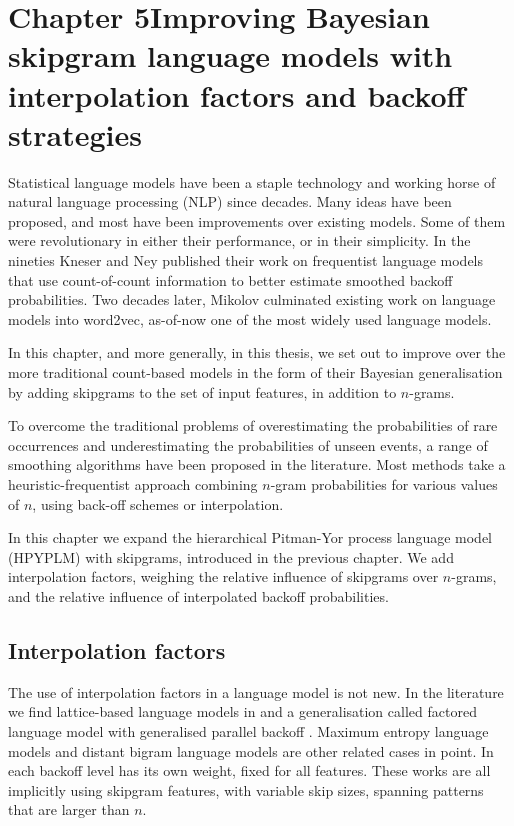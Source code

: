 \chapter{Chapter 5\newline Improving Bayesian skipgram language models \newline  with interpolation factors and backoff strategies}\label{chap:interpol}

Statistical language models have been a staple technology and working horse of natural language processing (NLP) since decades. Many ideas have been proposed, and most have been improvements over existing models. Some of them were revolutionary in either their performance, or in their simplicity. In the nineties Kneser and Ney\autocite{kneser1995improved} published their work on frequentist language models that use count-of-count information to better estimate smoothed backoff probabilities. Two decades later, Mikolov culminated existing work on language models into word2vec,\autocite{mikolov2013distributed} as-of-now one of the most widely used language models.

In this chapter, and more generally, in this thesis, we set out to improve over the more traditional count-based models in the form of their Bayesian generalisation by adding skipgrams to the set of input features, in addition to $n$-grams.

To overcome the traditional problems of overestimating the probabilities of rare occurrences and underestimating the probabilities of unseen events, a range of smoothing algorithms have been proposed in the literature\autocite{goodman2001bit}. Most methods take a heuristic-frequentist approach combining $n$-gram probabilities for various values of $n$, using back-off schemes or interpolation.

In this chapter we expand the hierarchical Pitman-Yor process language model (HPYPLM) with skipgrams,\autocite{onrust2016Improving} introduced in the previous chapter. We add interpolation factors, weighing the relative influence of skipgrams over $n$-grams, and the relative influence of interpolated backoff probabilities.

\section{Interpolation factors}

The use of interpolation factors in a language model is not new. In the literature we find lattice-based language models in
\autocite{dupont1997lattice} and a generalisation called factored language model with generalised parallel backoff \autocite{bilmes2003factored}. 
  Maximum entropy language models \autocite{ROSENFELD1996187} and distant bigram language models \autocite{bassiou2011long} are other related cases in point. In \autocite{gao2004long} each backoff level has its own weight, fixed for all features. These works are all implicitly using skipgram features, with variable skip sizes, spanning patterns that are larger than $n$. 
  
